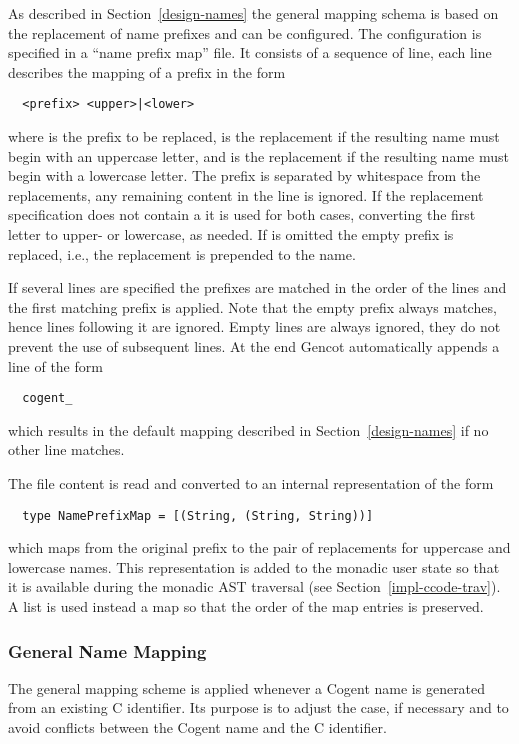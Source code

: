 As described in Section~\ref{design-names} the general mapping schema is based on the replacement of 
name prefixes and can be configured. The configuration is specified in a ``name prefix map'' file.
It consists of a sequence of line, each line describes the mapping of a prefix in the form
\begin{verbatim}
  <prefix> <upper>|<lower>
\end{verbatim}
where  is the prefix to be replaced,  is the replacement if the resulting 
name must begin with an uppercase letter, and  is the replacement if the resulting name 
must begin with a lowercase letter. The prefix is separated by whitespace from the replacements, any remaining content 
in the line is ignored. If the replacement specification does not contain a  it is used for
both cases, converting the first letter to upper- or lowercase, as needed. If  is omitted
the empty prefix is replaced, i.e., the replacement is prepended to the name. 

If several lines are specified the prefixes are matched in the order of the lines and the first matching
prefix is applied. Note that the empty prefix always matches, hence lines following it are ignored.
Empty lines are always ignored, they do not prevent the use of subsequent lines.
At the end Gencot automatically appends a line of the form
\begin{verbatim}
  cogent_
\end{verbatim}
which results in the default mapping described in Section~\ref{design-names} if no other line matches.

The file content is read and converted to an internal representation of the form 
\begin{verbatim}
  type NamePrefixMap = [(String, (String, String))]
\end{verbatim}
which maps from the original prefix to the pair of replacements for uppercase and lowercase names.
This representation is added to the monadic user state so that it is available during the monadic AST traversal
(see Section~\ref{impl-ccode-trav}). A list is used instead a map so that the order of the map entries
is preserved.

\subsubsection{General Name Mapping}

The general mapping scheme is applied whenever a Cogent name is generated from an existing C identifier.
Its purpose is to adjust the case, if necessary and to avoid conflicts between the Cogent name and
the C identifier.

